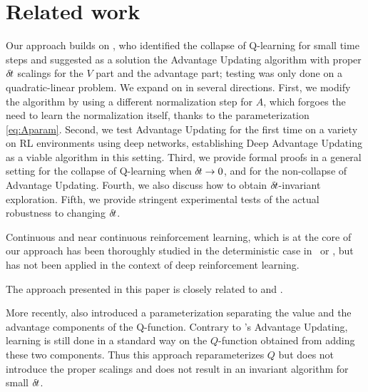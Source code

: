 \section{Related work}
\label{sec:related}

Our approach builds on \cite{adv_upd}, who identified the collapse of
Q-learning for small time steps and suggested as a solution the Advantage
Updating algorithm with proper ${\delta\hspace{-.1em}t}$ scalings for the $V$ part and
the advantage part; testing was only done on a quadratic-linear problem.
We expand on \cite{adv_upd} in several directions. First, we modify the
algorithm by
using a different normalization step for $A$, which forgoes the need to
learn the normalization itself, thanks to the parameterization
\eqref{eq:Aparam}. Second, we test Advantage Updating for the first time on a
variety on RL environments using deep networks, establishing Deep
Advantage Updating as a viable algorithm in this setting.  Third,
we provide formal proofs in a general setting for the collapse of Q-learning when ${\delta\hspace{-.1em}t}\to
0$, and for the non-collapse of Advantage Updating.
Fourth, we also discuss how to obtain ${\delta\hspace{-.1em}t}$-invariant exploration. Fifth, we
provide stringent experimental tests of the actual robustness to changing
${\delta\hspace{-.1em}t}$.

Continuous and near continuous reinforcement learning, which is at the core of
our approach has been thoroughly studied in the deterministic case
in~\cite{adv_upd} or \cite{cont_rl}, but has not been applied in the context of
deep reinforcement learning.

The approach presented in this paper is closely related to \cite{adv_upd} and
\cite{cont_rl}.

More recently, \cite{dueling_nets} also introduced a parameterization separating
the value and the advantage components of the Q-function. Contrary to
\cite{advup}'s Advantage Updating, learning is still done in a standard
way on the $Q$-function obtained from adding these two components. Thus this
approach reparameterizes $Q$ but does not introduce the proper scalings
and does not result in an invariant algorithm for small ${\delta\hspace{-.1em}t}$.%


